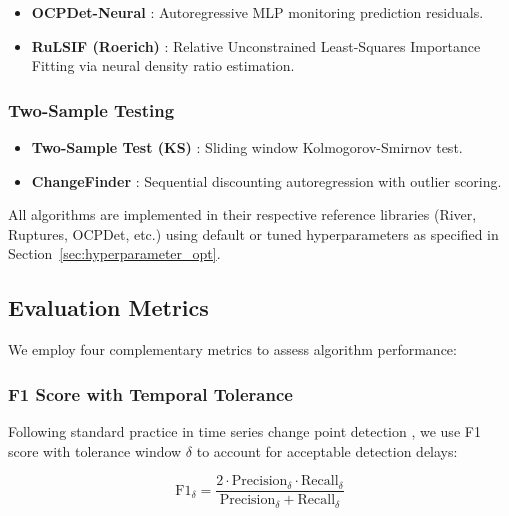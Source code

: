 \begin{itemize}
    \item \textbf{OCPDet-Neural} \cite{ocpdet2022}: Autoregressive MLP monitoring prediction residuals.
    
    \item \textbf{RuLSIF (Roerich)} \cite{roerich2021}: Relative Unconstrained Least-Squares Importance Fitting via neural density ratio estimation.
\end{itemize}

\subsubsection{Two-Sample Testing}

\begin{itemize}
    \item \textbf{Two-Sample Test (KS)} \cite{ross2011two}: Sliding window Kolmogorov-Smirnov test.
    
    \item \textbf{ChangeFinder} \cite{takeuchi2006unifying}: Sequential discounting autoregression with outlier scoring.
\end{itemize}

All algorithms are implemented in their respective reference libraries (River, Ruptures, OCPDet, etc.) using default or tuned hyperparameters as specified in Section~\ref{sec:hyperparameter_opt}.

\subsection{Evaluation Metrics}
\label{sec:metrics}

We employ four complementary metrics to assess algorithm performance:

\subsubsection{F1 Score with Temporal Tolerance}

Following standard practice in time series change point detection \cite{arlot2019kernel}, we use F1 score with tolerance window $\delta$ to account for acceptable detection delays:

\begin{equation}
\text{F1}_\delta = \frac{2 \cdot \text{Precision}_\delta \cdot \text{Recall}_\delta}{\text{Precision}_\delta + \text{Recall}_\delta}
\end{equation}

